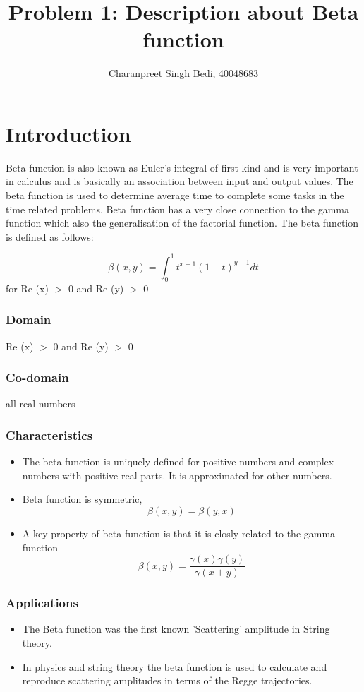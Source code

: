 \documentclass[10pt]{article}
\title{Problem 1: Description about Beta function}
\author{Charanpreet Singh Bedi, 40048683}
\date{}
\begin{document}
\maketitle


\section*{Introduction}
Beta function is also known as Euler's integral of first kind and is very important in calculus and is basically an association between input and output values. The beta function is used to determine average time to complete some tasks in the time related problems. Beta function has a very close connection to the gamma function which also the generalisation of the factorial function. The beta function is defined as follows: 


    $$\beta(x,y) =\int_{0}^{1} t^{x-1} (1-t)^{y-1} dt$$
    for Re (x) $>$ 0 and Re (y) $>$ 0
    
\subsubsection*{Domain}
Re (x) $>$ 0 and Re (y) $>$ 0

\subsubsection*{Co-domain}
all real numbers

\subsubsection*{Characteristics}
\begin{itemize}
    \item The beta function is uniquely defined for positive numbers and complex numbers with positive real parts. It is approximated for other numbers.
    \item Beta function is symmetric,$$ \beta(x,y) = \beta(y,x)$$
    \item A key property of beta function is that it is closly related to the gamma function
    $$\beta(x,y) = \frac{\gamma(x)\gamma(y)}{\gamma(x+y)}$$
\end{itemize}

\subsubsection*{Applications}
\begin{itemize}
    \item The Beta function was the first known 'Scattering' amplitude in String theory.
    \item In physics and string theory the beta function is used to calculate and reproduce scattering amplitudes in terms of the Regge trajectories.
\end{itemize}
\end{document}
